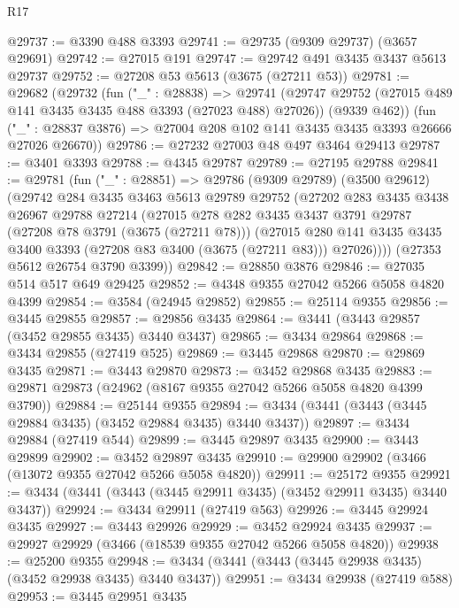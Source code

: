 \begin{lexlean}{R17}
\begin{coremodule}
@29737 := @3390 @488 @3393
@29741 := @29735 (@9309 @29737) (@3657 @29691)
@29742 := @27015 @191
@29747 := @29742 @491 @3435 @3437 @5613 @29737
@29752 := @27208 @53 @5613 (@3675 (@27211 @53))
@29781 := @29682
    (@29732
      (fun ("_" : @28838) =>
      @29741
        (@29747 @29752 (@27015 @489 @141 @3435 @3435 @488 @3393 (@27023 @488) @27026))
        (@9339 @462))
      (fun ("_" : @28837 @3876) => @27004 @208 @102 @141 @3435 @3435 @3393 @26666 @27026 @26670))
@29786 := @27232 @27003 @48 @497 @3464 @29413
@29787 := @3401 @3393
@29788 := @4345 @29787
@29789 := @27195 @29788
@29841 := @29781
    (fun ("_" : @28851) =>
    @29786
      (@9309 @29789)
      (@3500 @29612)
      (@29742
        @284
        @3435
        @3463
        @5613
        @29789
        @29752
        (@27202
          @283
          @3435
          @3438
          @26967
          @29788
          @27214
          (@27015
            @278
            @282
            @3435
            @3437
            @3791
            @29787
            (@27208 @78 @3791 (@3675 (@27211 @78)))
            (@27015
              @280
              @141
              @3435
              @3435
              @3400
              @3393
              (@27208 @83 @3400 (@3675 (@27211 @83)))
              @27026))))
      (@27353 @5612 @26754 @3790 @3399))
@29842 := @28850 @3876
@29846 := @27035 @514 @517 @649 @29425
@29852 := @4348 @9355 @27042 @5266 @5058 @4820 @4399
@29854 := @3584 (@24945 @29852)
@29855 := @25114 @9355
@29856 := @3445 @29855
@29857 := @29856 @3435
@29864 := @3441 (@3443 @29857 (@3452 @29855 @3435) @3440 @3437)
@29865 := @3434 @29864
@29868 := @3434 @29855 (@27419 @525)
@29869 := @3445 @29868
@29870 := @29869 @3435
@29871 := @3443 @29870
@29873 := @3452 @29868 @3435
@29883 := @29871 @29873 (@24962 (@8167 @9355 @27042 @5266 @5058 @4820 @4399 @3790))
@29884 := @25144 @9355
@29894 := @3434 (@3441 (@3443 (@3445 @29884 @3435) (@3452 @29884 @3435) @3440 @3437))
@29897 := @3434 @29884 (@27419 @544)
@29899 := @3445 @29897 @3435
@29900 := @3443 @29899
@29902 := @3452 @29897 @3435
@29910 := @29900 @29902 (@3466 (@13072 @9355 @27042 @5266 @5058 @4820))
@29911 := @25172 @9355
@29921 := @3434 (@3441 (@3443 (@3445 @29911 @3435) (@3452 @29911 @3435) @3440 @3437))
@29924 := @3434 @29911 (@27419 @563)
@29926 := @3445 @29924 @3435
@29927 := @3443 @29926
@29929 := @3452 @29924 @3435
@29937 := @29927 @29929 (@3466 (@18539 @9355 @27042 @5266 @5058 @4820))
@29938 := @25200 @9355
@29948 := @3434 (@3441 (@3443 (@3445 @29938 @3435) (@3452 @29938 @3435) @3440 @3437))
@29951 := @3434 @29938 (@27419 @588)
@29953 := @3445 @29951 @3435

\end{coremodule}
\end{lexlean}
